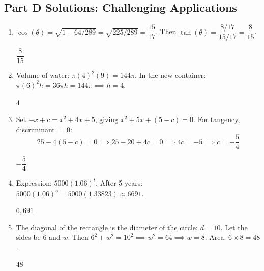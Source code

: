 \documentclass[14pt]{extarticle}
\begin{document}
\subsection*{Part D Solutions: Challenging Applications}
\begin{enumerate}
  \item \(\cos(\theta) = \sqrt{1 - 64/289} = \sqrt{225/289} = \dfrac{15}{17}\). Then \(\tan(\theta) = \dfrac{8/17}{15/17} = \dfrac{8}{15}\).

  \(\boxed{\dfrac{8}{15}}\)

  \item Volume of water: \(\pi(4)^2(9) = 144\pi\). In the new container: \(\pi(6)^2 h = 36\pi h = 144\pi \implies h = 4\).

  \(\boxed{4}\)

  \item Set \(-x + c = x^2 + 4x + 5\), giving \(x^2 + 5x + (5 - c) = 0\). For tangency, discriminant \(= 0\):
  \[
  25 - 4(5 - c) = 0 \implies 25 - 20 + 4c = 0 \implies 4c = -5 \implies c = -\frac{5}{4}
  \]

  \(\boxed{-\dfrac{5}{4}}\)

  \item Expression: \(5000(1.06)^t\). After 5 years: \(5000(1.06)^5 = 5000(1.33823) \approx 6691\).

  \(\boxed{6{,}691}\)

  \item The diagonal of the rectangle is the diameter of the circle: \(d = 10\). Let the sides be 6 and \(w\). Then \(6^2 + w^2 = 10^2 \implies w^2 = 64 \implies w = 8\). Area: \(6 \times 8 = 48\).

  \(\boxed{48}\)
\end{enumerate}
\end{document}
